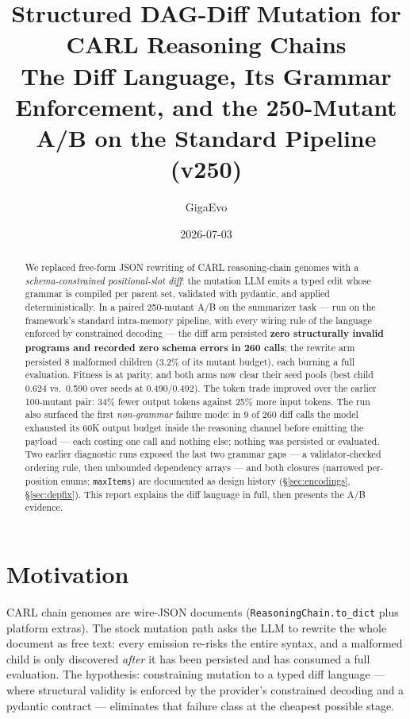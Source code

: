 \documentclass[11pt]{article}
\title{\color{accent}\bfseries Structured DAG-Diff Mutation for CARL Reasoning Chains\\
\large The Diff Language, Its Grammar Enforcement, and the 250-Mutant A/B on the Standard Pipeline (v250)}
\author{GigaEvo}
\date{2026-07-03}
\begin{document}
\maketitle

\begin{abstract}
\noindent
We replaced free-form JSON rewriting of CARL reasoning-chain genomes with a
\emph{schema-constrained positional-slot diff}: the mutation LLM emits a typed edit whose
grammar is compiled per parent set, validated with pydantic, and applied deterministically.
In a paired 250-mutant A/B on the summarizer task --- run on the framework's standard
intra-memory pipeline, with every wiring rule of the language enforced by constrained
decoding --- the diff arm persisted \textbf{zero structurally invalid programs and recorded
zero schema errors in 260 calls}; the rewrite arm persisted 8 malformed children (3.2\% of
its mutant budget), each burning a full evaluation. Fitness is at parity, and both arms now
clear their seed pools (best child 0.624 vs.\ 0.590 over seeds at 0.490/0.492). The token
trade improved over the earlier 100-mutant pair: 34\% fewer output tokens against 25\% more
input tokens. The run also surfaced the first \emph{non-grammar} failure mode: in 9 of 260
diff calls the model exhausted its 60K output budget inside the reasoning channel before
emitting the payload --- each costing one call and nothing else; nothing was persisted or
evaluated. Two earlier diagnostic runs exposed the last two grammar gaps --- a
validator-checked ordering rule, then unbounded dependency arrays --- and both closures
(narrowed per-position enums; \texttt{maxItems}) are documented as design history
(\S\ref{sec:encodings}, \S\ref{sec:depfix}). This report explains the diff language in
full, then presents the A/B evidence.
\end{abstract}

\section{Motivation}
CARL chain genomes are wire-JSON documents (\texttt{ReasoningChain.to\_dict} plus platform
extras). The stock mutation path asks the LLM to rewrite the whole document as free text:
every emission re-risks the entire syntax, and a malformed child is only discovered
\emph{after} it has been persisted and has consumed a full evaluation. The hypothesis:
constraining mutation to a typed diff language --- where structural validity is enforced by
the provider's constrained decoding and a pydantic contract --- eliminates that failure class
at the cheapest possible stage.
\end{document}
